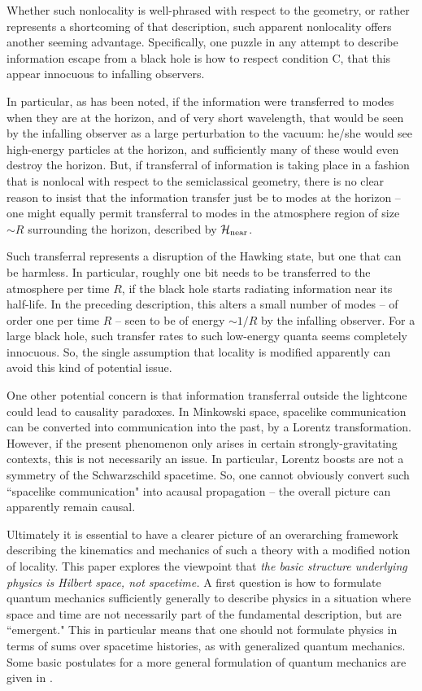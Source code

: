 Whether such nonlocality is well-phrased with respect to the geometry, or rather represents a shortcoming of that description, such apparent nonlocality offers another seeming advantage.  Specifically, one puzzle in any attempt to describe information escape from a black hole is how to respect condition C, that this appear innocuous to infalling observers.

In particular, as has been noted, if the information were transferred to modes when they are at the horizon, and of very short wavelength, that would be seen by the infalling observer as a large perturbation to the vacuum:  he/she would see high-energy particles at the horizon, and sufficiently many of these would even destroy the horizon.  But, if transferral of information is taking place in a fashion that is nonlocal with respect to the semiclassical geometry, there is no clear reason to insist that the information transfer just be to modes at the horizon -- one might equally permit transferral to modes in the atmosphere region of size $\sim R$ surrounding the horizon, described by ${{\cal H}_{\rm near}}$.  

Such transferral represents a disruption of the Hawking state, but one that can be harmless.  In particular, roughly one bit needs to be transferred to the atmosphere per time $R$, if the black hole starts radiating information near its half-life.  In the preceding description, this alters a small number of modes -- of order one per time $R$ -- seen to be of energy $\sim 1/R$ by the infalling observer.  For a large black hole, such transfer rates to such low-energy quanta seems completely innocuous.  So, the single assumption that locality is modified apparently can avoid this kind of potential issue.

One other potential concern is that information transferral outside the lightcone could lead to causality paradoxes.  In Minkowski space, spacelike communication can be converted into communication into the past, by a Lorentz transformation.  However, if the present phenomenon only arises in certain strongly-gravitating contexts, this is not necessarily an issue.  In particular, Lorentz boosts are not a symmetry of the Schwarzschild spacetime.  So, one cannot obviously convert such ``spacelike communication" into acausal propagation -- the overall picture can apparently remain causal.



Ultimately it is essential to have a clearer picture of an overarching framework describing the kinematics and mechanics of  such a theory with a modified notion of locality.  This paper explores the viewpoint that {\it the basic structure underlying physics is Hilbert space, not spacetime.}  A first question is how to formulate quantum mechanics sufficiently generally to describe physics in a situation where space and time are not necessarily part of the fundamental description, but are ``emergent."  This in particular means that one should not formulate physics in terms of sums over spacetime histories, as with  generalized quantum mechanics.  Some basic postulates for a more general formulation of quantum mechanics are given in .   

